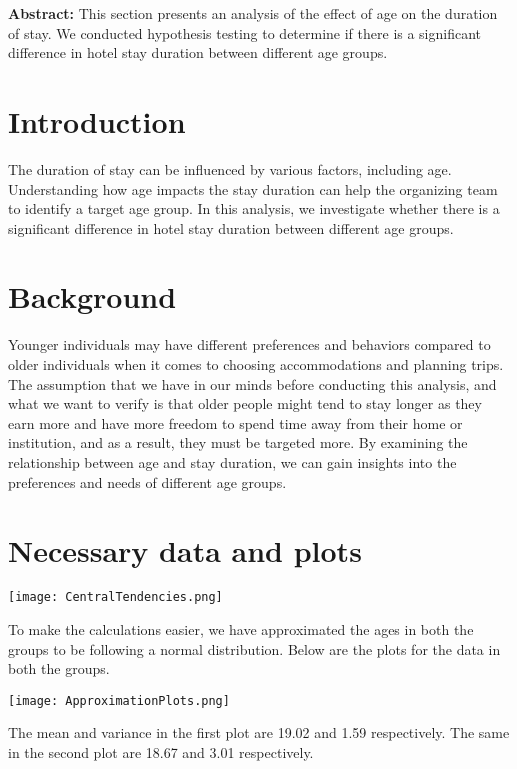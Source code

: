 \documentclass[oneside]{book}
\begin{document}
\textbf{\Large Abstract:}
\large This section presents an analysis of the effect of age on the duration of stay. We conducted hypothesis testing to determine if there is a significant difference in hotel stay duration between different age groups.

\section{Introduction}
\large The duration of stay can be influenced by various factors, including age. Understanding how age impacts the stay duration can help the organizing team to identify a target age group. In this analysis, we investigate whether there is a significant difference in hotel stay duration between different age groups.

\section{Background}
\large Younger individuals may have different preferences and behaviors compared to older individuals when it comes to choosing accommodations and planning trips. The assumption that we have in our minds before conducting this analysis, and what we want to verify is that older people might tend to stay longer as they earn more and have more freedom to spend time away from their home or institution, and as a result, they must be targeted more. By examining the relationship between age and stay duration, we can gain insights into the preferences and needs of different age groups.

\section{Necessary data and plots}
\begin{minipage}{\textwidth}
    \centering
    \texttt{[image: CentralTendencies.png]}
    \label{fig:enter-label}
\end{minipage}

\bigskip
\large To make the calculations easier, we have approximated the ages in both the groups to be following a normal distribution. Below are the plots for the data in both the groups.
\bigskip

\begin{minipage}{\textwidth}
    \centering
    \texttt{[image: ApproximationPlots.png]}
    \label{fig:enter-label}
\end{minipage}
The mean and variance in the first plot are 19.02 and 1.59 respectively. The same in the second plot are 18.67 and 3.01 respectively. 
\bigskip
\end{document}
